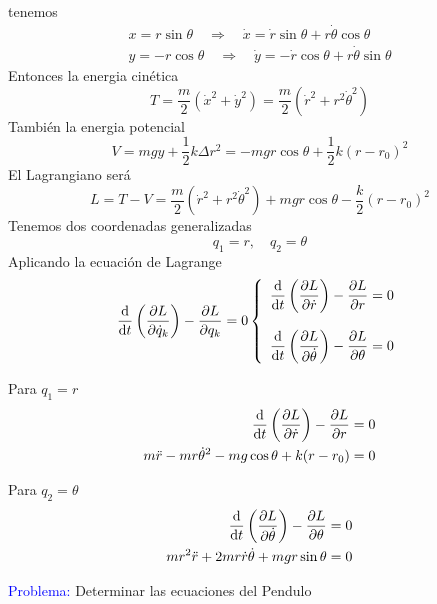 \documentclass[../main]{subfiles}
\begin{document}
tenemos
\begin{align*}
    x=r\sin \theta \quad \Rightarrow \quad \dot{x}=\dot{r}\sin \theta+r\dot{\theta}\cos \theta \\
    y=-r\cos \theta \quad \Rightarrow \quad \dot{y}=-\dot{r}\cos \theta+r\dot{\theta}\sin \theta
\end{align*}
Entonces la energia cinética
\begin{equation*}
    T=\dfrac{m}{2}(\dot{x}^2+\dot{y}^2)=\dfrac{m}{2}(\dot{r}^2+r^2\dot{\theta}^2)
\end{equation*}
También la energia potencial
\begin{equation*}
    V=mgy+\dfrac{1}{2}k\Delta r^2=-mgr\cos \theta+\dfrac{1}{2}k(r-r_0)^2
\end{equation*}
El Lagrangiano será
\begin{equation*}
    L=T-V=\dfrac{m}{2}(\dot{r}^2+r^2\dot{\theta}^2)+mgr\cos \theta-\dfrac{k}{2}(r-r_0)^2
\end{equation*}
Tenemos dos coordenadas generalizadas
\begin{equation*}
    q_1=r, \quad q_2=\theta
\end{equation*}
Aplicando la ecuación de Lagrange
\begin{equation*}
    \dv{}{t}\left(\pdv{L}{\dot{q}_k}\right)-\pdv{L}{q_k}=0
    \left\{
    \begin{array}{c}
        \displaystyle \dv{}{t}\left(\pdv{L}{\dot{r}}\right)-\pdv{L}{r}=0\\ \\
        \displaystyle \dv{}{t}\left(\pdv{L}{\dot{\theta}}\right)-\pdv{L}{\theta}=0
    \end{array}
    \right.
\end{equation*}

Para $q_1=r$
\begin{align*}
    \dv{}{t}\left(\pdv{L}{\dot{r}}\right)-\pdv{L}{r}=0\\
    m\ddot{r}-mr\dot{\theta}^2-mg\cos \theta+k(r-r_0)=0
\end{align*}

Para $q_2=\theta$
\begin{align*}
    \dv{}{t}\left(\pdv{L}{\dot{\theta}}\right)-\pdv{L}{\theta}=0\\
    mr^2\ddot{r}+2mr\dot{r}\dot{\theta}+mgr\sin \theta=0
\end{align*}

\textcolor{blue}{Problema:} Determinar las ecuaciones del Pendulo
\end{document}
